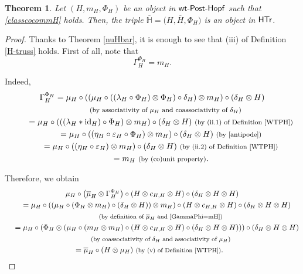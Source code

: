 \documentclass[pdftex]{sigma}
\numberwithin{equation}{section}
\newtheorem{Theorem}{Theorem}[section]
\begin{document}
\begin{Theorem}\label{Prop: Weak-nuHTr}
Let $(H,m_{H},\Phi_{H})$ be an object in ${\sf wt}\textnormal{-}\sf{Post}\textnormal{-}\sf{Hopf}$ such that \eqref{classcocommH} holds. Then, the triple
$\overline{\mathbb{H}}=\bigl(H,\overline{H},\Phi_{H}\bigr)$
is an object in $\sf{HTr}$.
\end{Theorem}
\begin{proof}
Thanks to Theorem \ref{nuHbar}, it is enough to see that (iii) of Definition \ref{H-truss} holds. First of all, note that \begin{equation}\label{GammaPhi=mH}\Gamma_{H}^{\Phi_{H}}=m_{H}.\end{equation}

Indeed,
\begin{gather*}
 \Gamma_{H}^{\Phi_{H}}= \mu_{H}\circ((\mu_{H}\circ((\lambda_{H}\circ\Phi_{H})\otimes\Phi_{H})\circ\delta_{H})\otimes m_{H})\circ(\delta_{H}\otimes H)\\
 \hphantom{\Gamma_{H}^{\Phi_{H}}=}{}\ \text{\footnotesize\textnormal{(by associativity of $\mu_{H}$ and coassociativity of $\delta_{H}$)}}\\
 \hphantom{\Gamma_{H}^{\Phi_{H}}}{}= \mu_{H}\circ(((\lambda_{H}\ast {\rm id}_{H})\circ\Phi_{H})\otimes m_{H})\circ(\delta_{H}\otimes H)\ \text{\footnotesize\textnormal{(by (ii.1) of Definition \ref{WTPH})}}\\
 \hphantom{\Gamma_{H}^{\Phi_{H}}}{}= \mu_{H}\circ((\eta_{H}\circ\varepsilon_{H}\circ\Phi_{H})\otimes m_{H})\circ(\delta_{H}\otimes H)\ \text{\footnotesize\textnormal{(by \eqref{antipode})}}\\
 \hphantom{\Gamma_{H}^{\Phi_{H}}}{}= \mu_{H}\circ((\eta_{H}\circ\varepsilon_{H})\otimes m_{H})\circ(\delta_{H}\otimes H)\ \text{\footnotesize\textnormal{(by (ii.2) of Definition \ref{WTPH})}}\\
 \hphantom{\Gamma_{H}^{\Phi_{H}}}{}= m_{H}\ \text{\footnotesize\textnormal{(by (co)unit property)}}.
\end{gather*}

Therefore, we obtain
\begin{gather*}
 \mu_{H}\circ\bigl(\overline{\mu}_{H}\otimes\Gamma_{H}^{\Phi_{H}}\bigr)\circ(H\otimes c_{H,H}\otimes H)\circ(\delta_{H}\otimes H\otimes H)\\
 \quad{}= \mu_{H}\circ((\mu_{H}\circ(\Phi_{H}\otimes m_{H})\circ(\delta_{H}\otimes H))\otimes m_{H})\circ(H\otimes c_{H,H}\otimes H)\circ(\delta_{H}\otimes H\otimes H)\\
 \qquad{}\;\text{\footnotesize\textnormal{(by definition of $\overline{\mu}_{H}$ and \eqref{GammaPhi=mH})}}\\
 \quad{}= \mu_{H}\circ(\Phi_{H}\otimes(\mu_{H}\circ(m_{H}\otimes m_{H})\circ(H\otimes c_{H,H}\otimes H)\circ(\delta_{H}\otimes H\otimes H)))\circ(\delta_{H}\otimes H\otimes H)\\
 \qquad{}\;\text{\footnotesize\textnormal{(by coassociativity of $\delta_{H}$ and associativity of $\mu_{H}$)}}\\
 \quad{}= \overline{\mu}_{H}\circ(H\otimes\mu_{H})\ \text{\footnotesize\textnormal{(by (v) of Definition \ref{WTPH})}}.
 \tag*{\qed}
\end{gather*}
\renewcommand{\qed}{}
\end{proof}
\end{document}
